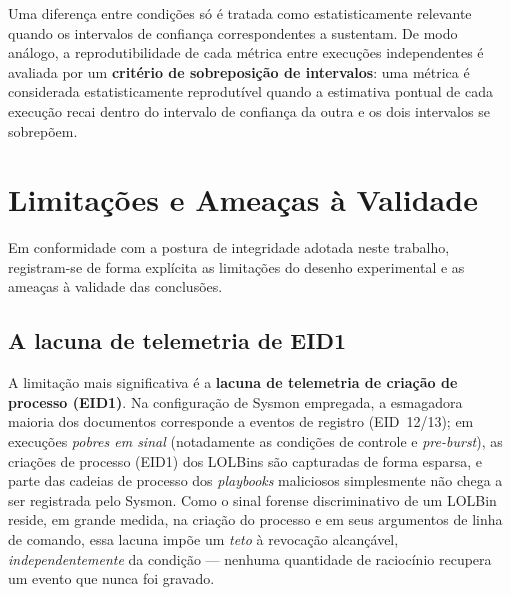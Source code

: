 Uma diferença entre condições só é tratada como estatisticamente relevante quando
os intervalos de confiança correspondentes a sustentam. De modo análogo, a
reprodutibilidade de cada métrica entre execuções independentes é avaliada por um
\textbf{critério de sobreposição de intervalos}: uma métrica é considerada
estatisticamente reprodutível quando a estimativa pontual de cada execução recai
dentro do intervalo de confiança da outra e os dois intervalos se sobrepõem.

\section{Limitações e Ameaças à Validade}
\label{sec:met-limitacoes}

Em conformidade com a postura de integridade adotada neste trabalho, registram-se
de forma explícita as limitações do desenho experimental e as ameaças à validade
das conclusões.

\subsection{A lacuna de telemetria de EID1}

A limitação mais significativa é a \textbf{lacuna de telemetria de criação de
processo (EID1)}. Na configuração de Sysmon empregada, a esmagadora maioria dos
documentos corresponde a eventos de registro (EID~12/13); em execuções
\emph{pobres em sinal} (notadamente as condições de controle e \textit{pre-burst}),
as criações de processo (EID1) dos LOLBins são capturadas de forma esparsa, e
parte das cadeias de processo dos \textit{playbooks} maliciosos simplesmente não
chega a ser registrada pelo Sysmon. Como o sinal forense discriminativo de um
LOLBin reside, em grande medida, na criação do processo e em seus argumentos de
linha de comando, essa lacuna impõe um \emph{teto} à revocação alcançável,
\emph{independentemente} da condição --- nenhuma quantidade de raciocínio recupera
um evento que nunca foi gravado.

